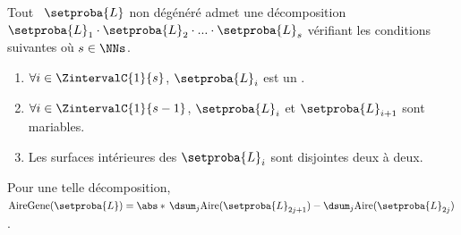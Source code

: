 \begin{fact} \label{ngone-trick}
    Tout \ncycle\ $\setproba{L}$ non dégénéré admet une décomposition
    $\setproba{L}_1 \cdot \setproba{L}_2 \cdot ... \cdot \setproba{L}_s$ 
    vérifiant les conditions suivantes où $s \in \NNs$.
    \begin{enumerate}
    	\item $\forall i \in \ZintervalC{1}{s}$, $\setproba{L}_i$ est un .
	
    	\item $\forall i \in \ZintervalC{1}{s-1}$, $\setproba{L}_i$ et $\setproba{L}_{i+1}$ sont mariables.

    	\item Les surfaces intérieures des  $\setproba{L}_i$ sont disjointes deux à deux.
    \end{enumerate}
    
    Pour une telle décomposition, 
    $ \garea{\setproba{L}} 
    = \abs*{\,
    	  \dsum_{j} \area{\setproba{L}_{2j + 1}}  
		- \dsum_{j} \area{\setproba{L}_{2j}}
	  \,}$.
\end{fact}


